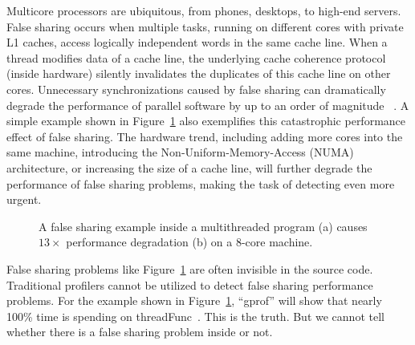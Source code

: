 Multicore processors are ubiquitous, from phones, desktops, to high-end servers.
False sharing occurs when multiple tasks, running on different cores with private L1 caches, access logically independent words in the same cache line. When a thread modifies data of a cache line, the underlying cache coherence protocol (inside hardware) silently invalidates the duplicates of this cache line on other cores. Unnecessary synchronizations caused by false sharing can dramatically degrade the performance of parallel software by up to an order of magnitude ~\cite{falseshare:effect}. A simple example shown in Figure~\ref{fig:penalty} also exemplifies this catastrophic performance effect of false sharing. The hardware trend, including adding more cores into the same machine, introducing the Non-Uniform-Memory-Access (NUMA) architecture, or increasing the size of a cache line, will further degrade the performance of false sharing problems, making the task of detecting even more urgent. 

\begin{figure}[htbp]
\centering
{}%
\hspace{30pt}
\caption{
A false sharing example inside a multithreaded program (a) causes $13\times$ performance degradation (b) on a 8-core machine.
\label{fig:penalty}}
\end{figure}

False sharing problems like Figure~\ref{fig:penalty} are often invisible in the source code. Traditional profilers cannot be utilized to detect false sharing performance problems. For the example shown in Figure~\ref{fig:penalty}, ``gprof'' will show that  nearly 100\% time is spending on threadFunc~\cite{gprof}. This is the truth. But we cannot tell whether there is a false sharing problem inside or not.


